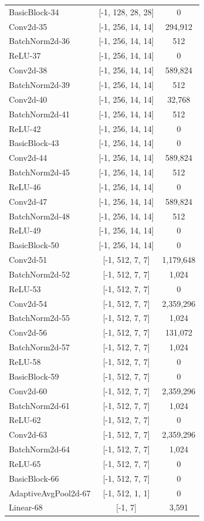 \begin{center}
\begin{longtable}{|l|c|c|}
BasicBlock-34 & [-1, 128, 28, 28] & 0 \\
Conv2d-35 & [-1, 256, 14, 14] & 294,912 \\
BatchNorm2d-36 & [-1, 256, 14, 14] & 512 \\
ReLU-37 & [-1, 256, 14, 14] & 0 \\
Conv2d-38 & [-1, 256, 14, 14] & 589,824 \\
BatchNorm2d-39 & [-1, 256, 14, 14] & 512 \\
Conv2d-40 & [-1, 256, 14, 14] & 32,768 \\
BatchNorm2d-41 & [-1, 256, 14, 14] & 512 \\
ReLU-42 & [-1, 256, 14, 14] & 0 \\
BasicBlock-43 & [-1, 256, 14, 14] & 0 \\
Conv2d-44 & [-1, 256, 14, 14] & 589,824 \\
BatchNorm2d-45 & [-1, 256, 14, 14] & 512 \\
ReLU-46 & [-1, 256, 14, 14] & 0 \\
Conv2d-47 & [-1, 256, 14, 14] & 589,824 \\
BatchNorm2d-48 & [-1, 256, 14, 14] & 512 \\
ReLU-49 & [-1, 256, 14, 14] & 0 \\
BasicBlock-50 & [-1, 256, 14, 14] & 0 \\
Conv2d-51 & [-1, 512, 7, 7] & 1,179,648 \\
BatchNorm2d-52 & [-1, 512, 7, 7] & 1,024 \\
ReLU-53 & [-1, 512, 7, 7] & 0 \\
Conv2d-54 & [-1, 512, 7, 7] & 2,359,296 \\
BatchNorm2d-55 & [-1, 512, 7, 7] & 1,024 \\
Conv2d-56 & [-1, 512, 7, 7] & 131,072 \\
BatchNorm2d-57 & [-1, 512, 7, 7] & 1,024 \\
ReLU-58 & [-1, 512, 7, 7] & 0 \\
BasicBlock-59 & [-1, 512, 7, 7] & 0 \\
Conv2d-60 & [-1, 512, 7, 7] & 2,359,296 \\
BatchNorm2d-61 & [-1, 512, 7, 7] & 1,024 \\
ReLU-62 & [-1, 512, 7, 7] & 0 \\
Conv2d-63 & [-1, 512, 7, 7] & 2,359,296 \\
BatchNorm2d-64 & [-1, 512, 7, 7] & 1,024 \\
ReLU-65 & [-1, 512, 7, 7] & 0 \\
BasicBlock-66 & [-1, 512, 7, 7] & 0 \\
AdaptiveAvgPool2d-67 & [-1, 512, 1, 1] & 0 \\
Linear-68 & [-1, 7] & 3,591 \\

\end{longtable}
\end{center}

